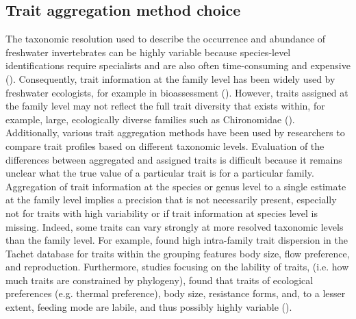 \documentclass[12pt]{article}
\begin{document}

\subsection*{Trait aggregation method choice}

The taxonomic resolution used to describe the occurrence and abundance of freshwater invertebrates can be highly variable because species-level identifications require specialists and are also often time-consuming and expensive (\cite{marshall_taxonomic_2006, resh_which_2008}). Consequently, trait information at the family level has been widely used by freshwater ecologists, for example in bioassessment (\cite{beketov_spear_2009}).
However, traits assigned at the family level may not reflect the full trait diversity that exists within, for example, large, ecologically diverse families such as Chironomidae (\cite{serra_synthesising_2016}). Additionally, various trait aggregation methods have been used by researchers to compare trait profiles based on different taxonomic levels. Evaluation of the differences between aggregated and assigned traits is difficult because it remains unclear what the true value of a particular trait is for a particular family. Aggregation of trait information at the species or genus level to a single estimate at the family level implies a precision that is not necessarily present, especially not for traits with high variability or if trait information at species level is missing. Indeed, some traits can vary strongly at more resolved taxonomic levels than the family level. For example, \citet{monaghan_improving_2013} found high intra-family trait dispersion in the Tachet database for traits within the grouping features body size, flow preference, and reproduction. Furthermore, studies focusing on the lability of traits, (i.e. how much traits are constrained by phylogeny), found that traits of ecological preferences (e.g. thermal preference), body size, resistance forms, and, to a lesser extent, feeding mode are labile, and thus possibly highly variable (\cite{poff_functional_2006, wilkes_traitbased_2020}). 
\end{document}
